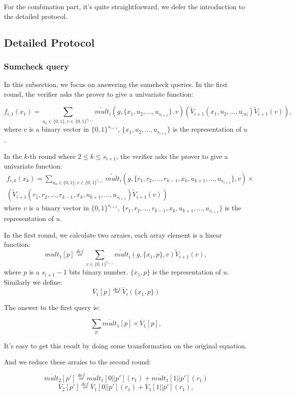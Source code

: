 For the combination part, it's quite straightforward, we defer the introduction to the detailed protocol.

\subsection{Detailed Protocol}
\subsubsection{Sumcheck query}
In this subsection, we focus on answering the sumcheck queries. In the first round, the verifier asks the prover to give a univariate function: 

$$f_{i, 1}(x_1)=\sum_{u_{k} \in \{0, 1\}, v \in \{0, 1\}^{s_{i+1}}}\tilde{mult}_{i}(g, \{x_1, u_{2},..., u_{s_{i+1}}\}, v)(\tilde{V}_{i+1}(x_1, u_{2},..., u_{|u|})\tilde{V}_{i+1}(v)),$$
where $v$ is a binary vector in $\{0, 1\}^{s_{i+1}}$, $\{x_1, u_{2},..., u_{s_{i+1}}\}$ is the representation of $u$.

In the $k$-th round where $2\le k\le s_{i+1}$, the verifier asks the prover to give a univariate function:
\begin{align*}
f_{i,k}(x_k)=\sum_{u_k \in \{0, 1\}, v \in \{0, 1\}^{s_{i+1}}}\tilde{mult}_{i}(g, \{r_1,r_2,...,r_{k-1},x_k, u_{k+1},..., u_{s_{i+1}}\}, v)\times\\
(\tilde{V}_{i+1}(r_1,r_2,...,r_{k-1},x_k, u_{k+1},..., u_{s_{i+1}})\tilde{V}_{i+1}(v))
\end{align*}
where $v$ is a binary vector in $\{0, 1\}^{s_{i+1}}$, $\{r_1,r_2,...,r_{k-1},x_k, u_{k+1},..., u_{s_{i+1}}\}$ is the representation of $u$.

In the first round, we calculate two arraies, each array element is a linear function:
$$\overline{mult}_1[p]\overset{def}{=}\sum_{v\in \{0,1\}^{s_{i+1}}}\tilde{mult}_i(g, \{x_1, p\}, v)\tilde{V}_{i+1}(v),$$
where $p$ is a $s_{i+1}-1$ bits binary number. $\{x_1, p\}$ is the representation of $u$. Similarly we define:
$$\overline{V}_1[p]\overset{def}{=}\tilde{V}_i(\{x_1, p\})$$

The answer to the first query is:

$$\sum_{p}\overline{mult}_1[p]\times\overline{V}_1[p],$$

It's easy to get this result by doing some transformation on the original equation.

And we reduce these arraies to the second round:

$$\overline{mult}_2[p']\overset{def}{=}\overline{mult}_1[0||p'](r_1)+\overline{mult}_1[1||p'](r_1)$$
$$\overline{V}_2[p']\overset{def}{=}\overline{V}_1[0||p'](r_1)+\overline{V}_1[1||p'](r_1),$$

